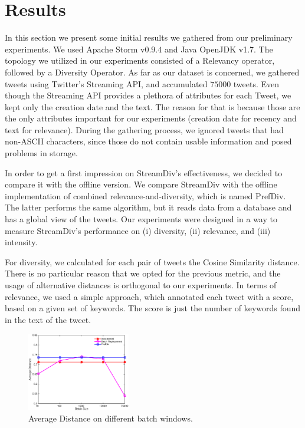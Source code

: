\section{Results} 
In this section we present some initial results we
gathered from our preliminary experiments.
We used Apache Storm v$0.9.4$ and Java
OpenJDK v1.7. The topology we utilized in our experiments
consisted of a Relevancy operator, followed by a
Diversity Operator.
As far as our dataset is concerned,
we gathered tweets using Twitter's Streaming API,
and accumulated $75000$ tweets.
Even though the Streaming API provides a
plethora of attributes for each Tweet, we
kept only the creation date and the text.
The reason for that is because those are
the only attributes important for our experiments
(creation date for recency and text for relevance).
During the gathering process, we ignored tweets
that had non-ASCII characters, since those do
not contain usable information and posed
problems in storage.

In order to get a first impression on StreamDiv's
effectiveness, we decided to compare it with the
offline version.
We compare StreamDiv with the offline implementation
of combined relevance-and-diversity, which is named
PrefDiv. The latter performs the same
algorithm, but it reads data from a database
and has a global view of the tweets.
Our experiments were designed in a way to measure
StreamDiv's performance on (i) diversity, (ii) relevance,
and (iii) intensity.

For diversity, we calculated for each pair of tweets
the Cosine Similarity distance. There is no particular
reason that we opted for the previous metric, and the
usage of alternative distances is orthogonal to our
experiments. In terms of relevance, we used a simple
approach, which annotated each tweet with a score,
based on a given set of keywords.
The score is just the number of
keywords found in the text of the tweet.

\begin{figure}[!htb]
\centering
\includegraphics[width=0.4\textwidth,height=0.4\textheight,keepaspectratio]{Figures/AverageDistance.eps}
\caption{Average Distance on different batch windows.}
\label{fig:avg-distance}
\end{figure}

